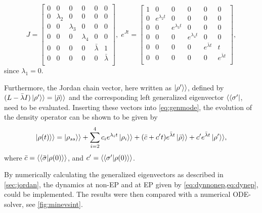 \documentclass[../main.tex]{subfiles}
\begin{document}
\begin{equation}
    J = \begin{bmatrix} 0 & 0 & 0 & 0 & 0 & 0 \\
                        0 & \lambda_2 & 0 & 0 & 0 & 0 \\
                        0 & 0 & \lambda_3 & 0 & 0 & 0 \\
                        0 & 0 & 0 & \lambda_4 & 0 & 0 \\
                        0 & 0 & 0 & 0 & \bar \lambda & 1 \\
                        0 & 0 & 0 & 0 & 0 & \bar \lambda \\ \end{bmatrix}, \; 
        e^{Jt} = \begin{bmatrix} 1 & 0 & 0 & 0 & 0 & 0 \\
            0 & e^{\lambda_2t} & 0 & 0 & 0 & 0 \\
            0 & 0 & e^{\lambda_3t} & 0 & 0 & 0 \\
            0 & 0 & 0 & e^{\lambda_4t} & 0 & 0 \\
            0 & 0 & 0 & 0 & e^{\bar \lambda t} & t \\
        0 & 0 & 0 & 0 & 0 & e^{\bar \lambda t} \\ \end{bmatrix},
\end{equation}
since $\lambda_1 = 0$.

Furthermore, the Jordan chain vector, here written as $\ket{\rho'}\rangle$, defined by $(L - \bar\lambda I)\ket{\rho'}\rangle = \ket{\bar\rho}\rangle$ and the corresponding left generalized eigenvector $\langle\bra{\sigma'}$, need to be evaluated. Inserting these vectors into \cref{eq:genmode}, the evolution of the density operator can be shown to be given by
\begin{equation}\label{eq:dynep}
    \begin{aligned}
        \ket{\rho(t)}\rangle = \ket{\rho_{ss}}\rangle + \sum_{i=2}^4 c_i e^{\lambda_i t} \ket{\rho_i}\rangle  
                                + (\bar c + c't)e^{\bar \lambda t}\ket{\bar \rho}\rangle + c'e^{\bar\lambda t}\ket{\rho'}\rangle,
    \end{aligned}
\end{equation}
where $\bar c = \langle\braket{\bar\sigma|\rho(0)}\rangle$, and $c' = \langle\braket{\sigma'|\rho(0)}\rangle$.

By numerically calculating the generalized eigenvectors as described in \cref{sec:jordan}, the dynamics at non-EP and at EP given by \cref{eq:dynnonep,eq:dynep}, could be implemented. The results were then compared with a numerical ODE-solver, see \cref{fig:minevsint}.
\end{document}
